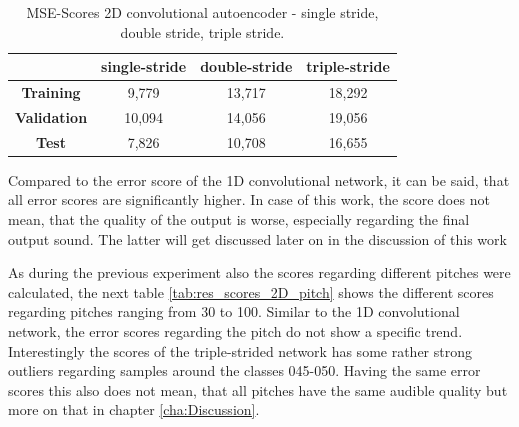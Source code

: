 \begin{table}[htb!]
    \centering
    \captionsetup{justification=centering}
    \begin{tabular}{|c|c|c|c|}
        \hline
         & \textbf{single-stride} & \textbf{double-stride} & \textbf{triple-stride} \\
         \hline
        \textbf{Training} & 9,779 & 13,717 & 18,292 \\
        \hline
        \textbf{Validation} & 10,094 & 14,056 & 19,056 \\
        \hline
        \textbf{Test} & 7,826 & 10,708 & 16,655 \\
        \hline
    \end{tabular}
    \caption{MSE-Scores 2D convolutional autoencoder - single stride, double stride, triple stride.}
    \label{tab:res_scores_2Dcae}
\end{table}

Compared to the error score of the 1D convolutional network, it can be said, that all error scores are significantly higher. In case of this work, the score does not mean, that the quality of the output is worse, especially regarding the final output sound. The latter will get discussed later on in the discussion of this work

As during the previous experiment also the scores regarding different pitches were calculated, the next table \ref{tab:res_scores_2D_pitch} shows the different scores regarding pitches ranging from 30 to 100. Similar to the 1D convolutional network, the error scores regarding the pitch do not show a specific trend. Interestingly the scores of the triple-strided network has some rather strong outliers regarding samples around the classes 045-050. Having the same error scores this also does not mean, that all pitches have the same audible quality but more on that in chapter \ref{cha:Discussion}. 



